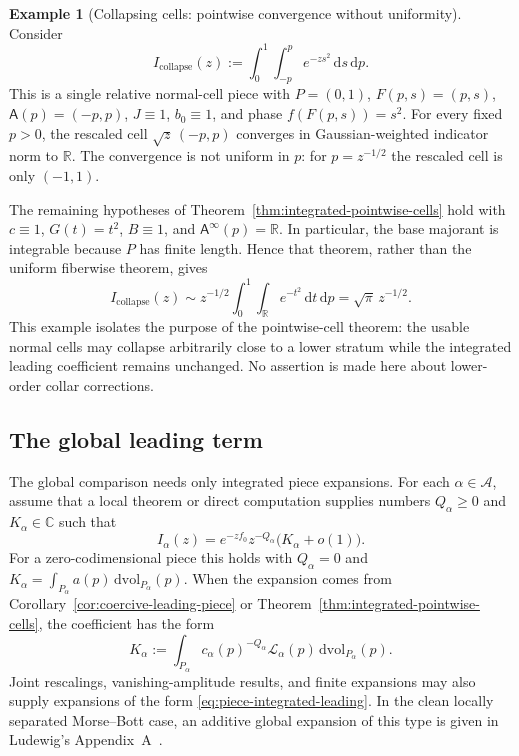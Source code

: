 \documentclass[11pt]{amsart}
\numberwithin{equation}{section}
\theoremstyle{definition}
\newtheorem{example}[theorem]{Example}
\theoremstyle{remark}
\newcommand{\R}{\mathbb{R}}
\newcommand{\C}{\mathbb{C}}
\newcommand{\dd}{\,\mathrm{d}}
\newcommand{\dvol}{\,\mathrm{dvol}}
\newcommand{\cA}{\mathcal{A}}
\newcommand{\Afib}{\mathsf{A}}
\newcommand{\cL}{\mathcal{L}}
\begin{document}
\begin{example}[Collapsing cells: pointwise convergence without uniformity]
\label{ex:collapsing-cells}
Consider
\[
 I_{\mathrm{collapse}}(z):=\int_0^1\int_{-p}^{p}e^{-zs^2}\dd s\dd p.
\]
This is a single relative normal-cell piece with $P=(0,1)$,
$F(p,s)=(p,s)$, $\Afib(p)=(-p,p)$, $J\equiv1$, $b_0\equiv1$, and phase
$f(F(p,s))=s^2$.  For every fixed $p>0$, the rescaled cell
$\sqrt z\,(-p,p)$ converges in Gaussian-weighted indicator norm to $\R$.
The convergence is not uniform in $p$: for $p=z^{-1/2}$ the rescaled cell is
only $(-1,1)$.

The remaining hypotheses of
Theorem~\ref{thm:integrated-pointwise-cells} hold with
$c\equiv1$, $G(t)=t^2$, $B\equiv1$, and
$\Afib^\infty(p)=\R$.  In particular, the base majorant is integrable because
$P$ has finite length.  Hence that theorem, rather than the uniform
fiberwise theorem, gives
\[
 I_{\mathrm{collapse}}(z)\sim z^{-1/2}\int_0^1\int_\R e^{-t^2}\dd t\dd p
 =\sqrt\pi\,z^{-1/2}.
\]
This example isolates the purpose of the pointwise-cell theorem: the usable
normal cells may collapse arbitrarily close to a lower stratum while the
integrated leading coefficient remains unchanged.  No assertion is made here about lower-order collar corrections.
\end{example}

\subsection{The global leading term}

The global comparison needs only integrated piece expansions.  For each
$\alpha\in\cA$, assume that a local theorem or direct computation supplies
numbers $Q_\alpha\ge0$ and $K_\alpha\in\C$ such that
\begin{equation}\label{eq:piece-integrated-leading}
 I_\alpha(z)=e^{-zf_0}z^{-Q_\alpha}\bigl(K_\alpha+o(1)\bigr).
\end{equation}
For a zero-codimensional piece this holds with $Q_\alpha=0$ and
$K_\alpha=\int_{P_\alpha}a(p)\dvol_{P_\alpha}(p)$.  When the expansion comes
from Corollary~\ref{cor:coercive-leading-piece} or
Theorem~\ref{thm:integrated-pointwise-cells}, the coefficient has the form
\begin{equation}\label{eq:piece-coefficient}
  K_\alpha:=\int_{P_\alpha}c_\alpha(p)^{-Q_\alpha}
  \cL_\alpha(p)\dvol_{P_\alpha}(p).
\end{equation}
Joint rescalings, vanishing-amplitude results, and finite expansions may also
supply expansions of the form
\eqref{eq:piece-integrated-leading}.  In the clean
locally separated Morse--Bott case, an additive global expansion of this type is
given in Ludewig's Appendix~A~\cite{Ludewig}.
\end{document}
